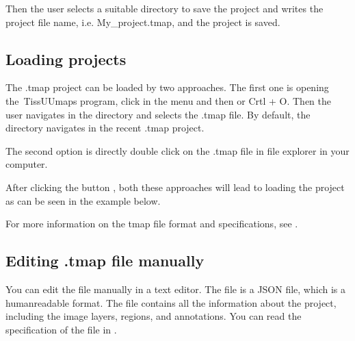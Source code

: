 \documentclass[letterpaper,10pt,english,openany,oneside]{sphinxmanual}
\begin{document}
\sphinxAtStartPar
Then the user selects a suitable directory to save the project and writes the project file name, i.e. My\_project.tmap, and the project is saved.

\sphinxAtStartPar
{}


\subsection{Loading projects}
\label{\detokenize{docs/starting/projects:loading-projects}}
\sphinxAtStartPar
The .tmap project can be loaded by two approaches. The first one is opening the TissUUmaps program, click  in the menu and then  or Crtl + O. Then the user navigates in the directory and selects the .tmap file. By default, the directory navigates in the recent .tmap project.

\sphinxAtStartPar
{}

\sphinxAtStartPar
The second option is directly double click on the .tmap file in file explorer in your computer.

\sphinxAtStartPar
{}

\sphinxAtStartPar
After clicking the button , both these approaches will lead to loading the project as can be seen in the example below.

\sphinxAtStartPar
{}

\sphinxAtStartPar
For more information on the tmap file format and specifications, see {\hyperref[\detokenize{docs/advanced/tmap:the-tmap-file-format}]{}}.


\subsection{Editing .tmap file manually}
\label{\detokenize{docs/starting/projects:editing-tmap-file-manually}}
\sphinxAtStartPar
You can edit the  file manually in a text editor. The  file is a JSON file, which is a human\sphinxhyphen{}readable format. The  file contains all the information about the project, including the image layers, regions, and annotations. You can read the specification of the  file in {\hyperref[\detokenize{docs/advanced/tmap:the-tmap-file-format}]{}}.
\end{document}
